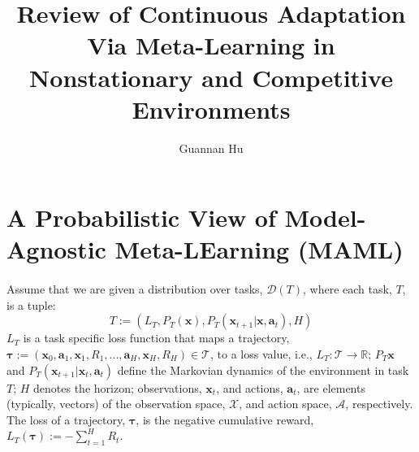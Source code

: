\documentclass[12pt,a4paper]{article}
\begin{document}
\title{Review of Continuous Adaptation Via Meta-Learning in Nonstationary and Competitive Environments}
\author{Guannan Hu}
\maketitle
\section{A Probabilistic View of Model-Agnostic Meta-LEarning (MAML)}
\paragraph{}Assume that we are given a distribution over tasks, $\mathcal{D}(T)$, where each task, $T$, is a tuple:
\begin{equation}
T := (L_T, P_T(\mathbf{x}), P_T(\mathbf{x}_{t+1}|\mathbf{x}, \mathbf{a}_t), H)
\end{equation}
$L_T$ is a task specific loss function that maps a trajectory, $\bm{\tau} := (\mathbf{x}_0, \mathbf{a}_1, \mathbf{x}_1, R_1, ..., \mathbf{a}_H, \mathbf{x}_H, R_H) \in \mathcal{T}$, to a loss value, i.e., $L_T: \mathcal{T} \rightarrow \mathbb{R}$; $P_T{\mathbf{x}}$ and $P_T(\mathbf{x}_{t+1}|\mathbf{x}_t, \mathbf{a}_t)$ define the Markovian dynamics of the environment in task $T$; $H$ denotes the horizon; observations, $\mathbf{x}_t$, and actions, $\mathbf{a}_t$, are elements (typically, vectors) of the observation space, $\mathcal{X}$, and action space, $\mathcal{A}$, respectively. The loss of a trajectory, $\bm{\tau}$, is the negative cumulative reward, $L_T(\bm{\tau}) := -\sum_{t=1}^{H}R_t$.
%


\end{document}
